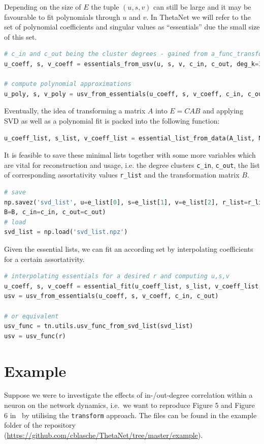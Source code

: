 \documentclass[bibliography=totoc, twoside]{article}
\numberwithin{equation}{section}
\begin{document}
Depending on the size of $E$ the tuple $(u, s, v)$ can still be large and it may be favourable to fit polynomials through $u$ and $v$.
In ThetaNet we will refer to the set of polynomial coefficients and singular values as ``essentials'' due the small size of this set.
\begin{lstlisting}[language=python]
# c_in and c_out being the cluster degrees - gained from a_func_transform()
u_coeff, s, v_coeff = essentials_from_usv(u, s, v, c_in, c_out, deg_k=3)

# compute polynomial approximations
u_poly, s, v_poly = usv_from_essentials(u_coeff, s, v_coeff, c_in, c_out)
\end{lstlisting}
Eventually, the idea of transforming a matrix $A$ into $E=CAB$ and applying SVD as well as a polynomial fit is packed into the following function:
\begin{lstlisting}[language=python]
u_coeff_list, s_list, v_coeff_list = essential_list_from_data(A_list, N_c_in, N_c_out, deg_k=3, m=3, mapping='cumsum')
\end{lstlisting}
It is feasible to save these minimal lists together with some more variables which are vital for reconstruction and usage, i.e. the degree clusters \texttt{c\_in}, \texttt{c\_out}, the list of corresponding assortativity values \texttt{r\_list} and the transformation matrix $B$.
\begin{lstlisting}[language=python]
# save
np.savez('svd_list', u=e_list[0], s=e_list[1], v=e_list[2], r_list=r_list,
B=B, c_in=c_in, c_out=c_out)
# load
svd_list = np.load('svd_list.npz')
\end{lstlisting}
Given the essential lists, we can fit an according set by interpolating coefficients for a certain assortativity.
\begin{lstlisting}[language=python]
# interpolating essentials for a desired r and computing u,s,v
u_coeff, s, v_coeff = essential_fit(u_coeff_list, s_list, v_coeff_list, r_list, r)
usv = usv_from_essentials(u_coeff, s, v_coeff, c_in, c_out)

# or equivalent
usv_func = tn.utils.usv_func_from_svd_list(svd_list)
usv = usv_func(r)
\end{lstlisting}


\section{Example}
Suppose we were to investigate the effects of in-/out-degree correlation within a neuron on the network dynamics, i.e.\ we want to reproduce Figure 5 and Figure 6 in~\cite{laing2019} by utilising the \texttt{transform} approach.
The files can be found in the example folder of the repository (\url{https://github.com/cblasche/ThetaNet/tree/master/example}).
\end{document}
